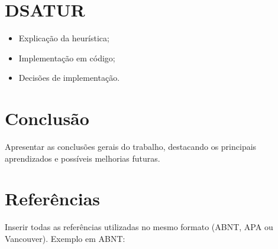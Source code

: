 \documentclass[12pt,a4paper]{article}
\begin{document}
\section{DSATUR}
\begin{itemize}
\item Explicação da heurística;
\item Implementação em código;
\item Decisões de implementação.
\end{itemize}


\section{Conclusão}
Apresentar as conclusões gerais do trabalho, destacando os principais aprendizados e possíveis melhorias futuras.

\section*{Referências}

Inserir todas as referências utilizadas no mesmo formato (ABNT, APA ou Vancouver).  
Exemplo em ABNT:

\end{document}

